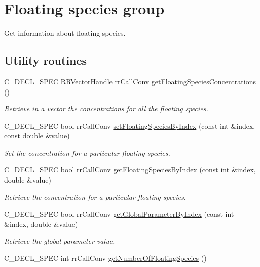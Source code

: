 \hypertarget{group__floating}{
\section{\-Floating species group}
\label{group__floating}
}


\-Get information about floating species.  


\subsection*{\-Utility routines}
\begin{DoxyCompactItemize}
\item 
\-C\-\_\-\-D\-E\-C\-L\-\_\-\-S\-P\-E\-C \hyperlink{rr__c__types_8h_aea46a16752b0ae2cd95c009030ee630e}{\-R\-R\-Vector\-Handle} \*
rr\-Call\-Conv \hyperlink{group__utility_ga0db8fe5f89985f27ea4ddb3c595b16fd}{get\-Floating\-Species\-Concentrations} ()
\begin{DoxyCompactList}\small\item\em \-Retrieve in a vector the concentrations for all the floating species. \end{DoxyCompactList}\item 
\-C\-\_\-\-D\-E\-C\-L\-\_\-\-S\-P\-E\-C bool rr\-Call\-Conv \hyperlink{group__utility_gaf4a5a4d9b1ecf60d4b98189b4bcf2543}{set\-Floating\-Species\-By\-Index} (const int \&index, const double \&value)
\begin{DoxyCompactList}\small\item\em \-Set the concentration for a particular floating species. \end{DoxyCompactList}\item 
\-C\-\_\-\-D\-E\-C\-L\-\_\-\-S\-P\-E\-C bool rr\-Call\-Conv \hyperlink{group__utility_ga03a4d63d50d5d17ef4af232f8ccee67a}{get\-Floating\-Species\-By\-Index} (const int \&index, double \&value)
\begin{DoxyCompactList}\small\item\em \-Retrieve the concentration for a particular floating species. \end{DoxyCompactList}\item 
\-C\-\_\-\-D\-E\-C\-L\-\_\-\-S\-P\-E\-C bool rr\-Call\-Conv \hyperlink{group__utility_ga47005834042cc7bd12dce8de8fa031ef}{get\-Global\-Parameter\-By\-Index} (const int \&index, double \&value)
\begin{DoxyCompactList}\small\item\em \-Retrieve the global parameter value. \end{DoxyCompactList}\item 
\hypertarget{group__utility_ga9a96b81c58073caff01ea2c9e0f5e119}{
\-C\-\_\-\-D\-E\-C\-L\-\_\-\-S\-P\-E\-C int rr\-Call\-Conv \hyperlink{group__utility_ga9a96b81c58073caff01ea2c9e0f5e119}{get\-Number\-Of\-Floating\-Species} ()}
\label{group__utility_ga9a96b81c58073caff01ea2c9e0f5e119}


\end{DoxyCompactItemize}
